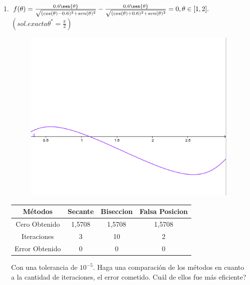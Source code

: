 \documentclass{udparticle}
\begin{document}
\begin{enumerate}
\begin{enumerate}
\begin{table}[H]
\begin{tabular} { |c|c|c|c|}
        \end{tabular}
    \end{table}
\newpage
\item $ f (\theta) = \frac{0.6\sen{\theta}}{\sqrt{(cos(\theta) - 0.6)^2 + sen(\theta)^2}} -  \frac{0.6\sen{\theta}}{\sqrt{(cos(\theta) + 0.6)^2 + sen(\theta)^2}} = 0, \theta \in [1,2].$
$(sol. exacta \theta^* = \frac{\pi}{2})$

    \begin{figure}[H]
    \centering
    \includegraphics[width=11cm]{GraficoEj1e}
    \end{figure}

    \begin{table}[H]
    \centering
        \begin{tabular} { |c|c|c|c|}
        
        \hline
        Métodos       & Secante & Biseccion & Falsa Posicion \\
        \hline
        Cero Obtenido &  1,5708       &   1,5708       &      1,5708        \\
        \hline
        Iteraciones   &     3        &      10        &        2       \\
        \hline
        Error Obtenido  &   0        &      0      &          0  \\
        \hline
        
        \end{tabular}
    \end{table}
    
Con una tolerancia de $ 10^{-5} $. Haga una comparación de los métodos en cuanto a la cantidad de iteraciones, el error cometido. Cuál de ellos fue más eficiente?


\end{enumerate}
\end{enumerate}
\end{document}
